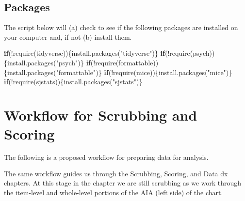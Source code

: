 \documentclass[
]{book}
\newenvironment{Shaded}{\begin{snugshade}}{\end{snugshade}}
\newcommand{\ControlFlowTok}[1]{\textcolor[rgb]{0.13,0.29,0.53}{\textbf{#1}}}
\newcommand{\FunctionTok}[1]{\textcolor[rgb]{0.00,0.00,0.00}{#1}}
\newcommand{\NormalTok}[1]{#1}
\newcommand{\SpecialCharTok}[1]{\textcolor[rgb]{0.00,0.00,0.00}{#1}}
\newcommand{\StringTok}[1]{\textcolor[rgb]{0.31,0.60,0.02}{#1}}
\begin{document}
\hypertarget{packages-2}{%
\subsection{Packages}\label{packages-2}}

The script below will (a) check to see if the following packages are installed on your computer and, if not (b) install them.

\begin{Shaded}
\begin{Highlighting}[]
\ControlFlowTok{if}\NormalTok{(}\SpecialCharTok{!}\FunctionTok{require}\NormalTok{(tidyverse))\{}\FunctionTok{install.packages}\NormalTok{(}\StringTok{"tidyverse"}\NormalTok{)\}}
\ControlFlowTok{if}\NormalTok{(}\SpecialCharTok{!}\FunctionTok{require}\NormalTok{(psych))\{}\FunctionTok{install.packages}\NormalTok{(}\StringTok{"psych"}\NormalTok{)\}}
\ControlFlowTok{if}\NormalTok{(}\SpecialCharTok{!}\FunctionTok{require}\NormalTok{(formattable))\{}\FunctionTok{install.packages}\NormalTok{(}\StringTok{"formattable"}\NormalTok{)\}}
\ControlFlowTok{if}\NormalTok{(}\SpecialCharTok{!}\FunctionTok{require}\NormalTok{(mice))\{}\FunctionTok{install.packages}\NormalTok{(}\StringTok{"mice"}\NormalTok{)\}}
\ControlFlowTok{if}\NormalTok{(}\SpecialCharTok{!}\FunctionTok{require}\NormalTok{(sjstats))\{}\FunctionTok{install.packages}\NormalTok{(}\StringTok{"sjstats"}\NormalTok{)\}}
\end{Highlighting}
\end{Shaded}

\hypertarget{workflow-for-scrubbing-and-scoring-1}{%
\section{Workflow for Scrubbing and Scoring}\label{workflow-for-scrubbing-and-scoring-1}}

The following is a proposed workflow for preparing data for analysis.

The same workflow guides us through the Scrubbing, Scoring, and Data dx chapters. At this stage in the chapter we are still scrubbing as we work through the item-level and whole-level portions of the AIA (left side) of the chart.
\end{document}
